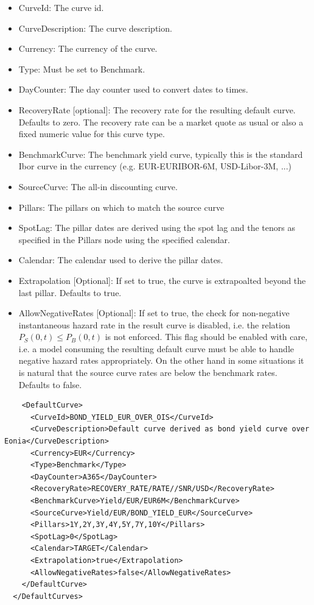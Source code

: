 \begin{itemize}
\item CurveId: The curve id.
\item CurveDescription: The curve description.
\item Currency: The currency of the curve.
\item Type: Must be set to Benchmark.
\item DayCounter: The day counter used to convert dates to times.
\item RecoveryRate [optional]: The recovery rate for the resulting default curve. Defaults to zero. The recovery rate
  can be a market quote as usual or also a fixed numeric value for this curve type.
\item BenchmarkCurve: The benchmark yield curve, typically this is the standard Ibor curve in the currency
  (e.g. EUR-EURIBOR-6M, USD-Libor-3M, ...)
\item SourceCurve: The all-in discounting curve.
\item Pillars: The pillars on which to match the source curve
\item SpotLag: The pillar dates are derived using the spot lag and the tenors as specified in the Pillars node using the
  specified calendar.
\item Calendar: The calendar used to derive the pillar dates.
\item Extrapolation [Optional]: If set to true, the curve is extrapoalted beyond the last pillar. Defaults to true.
\item AllowNegativeRates [Optional]: If set to true, the check for non-negative instantaneous hazard rate in the result
  curve is disabled, i.e. the relation $P_S(0,t) \leq P_B(0,t)$ is not enforced. This flag should be enabled with care,
  i.e.  a model consuming the resulting default curve must be able to handle negative hazard rates appropriately. On the
  other hand in some situations it is natural that the source curve rates are below the benchmark rates. Defaults to
  false.
\end{itemize}

\begin{longlisting}
\begin{verbatim}
    <DefaultCurve>
      <CurveId>BOND_YIELD_EUR_OVER_OIS</CurveId>
      <CurveDescription>Default curve derived as bond yield curve over Eonia</CurveDescription>
      <Currency>EUR</Currency>
      <Type>Benchmark</Type>
      <DayCounter>A365</DayCounter>
      <RecoveryRate>RECOVERY_RATE/RATE//SNR/USD</RecoveryRate>
      <BenchmarkCurve>Yield/EUR/EUR6M</BenchmarkCurve>
      <SourceCurve>Yield/EUR/BOND_YIELD_EUR</SourceCurve>
      <Pillars>1Y,2Y,3Y,4Y,5Y,7Y,10Y</Pillars>
      <SpotLag>0</SpotLag>
      <Calendar>TARGET</Calendar>
      <Extrapolation>true</Extrapolation>
      <AllowNegativeRates>false</AllowNegativeRates>
    </DefaultCurve>
  </DefaultCurves>
\end{verbatim}
\caption{Benchmark default curve}
\label{lst:defaultcurve_benchmark}
\end{longlisting}

